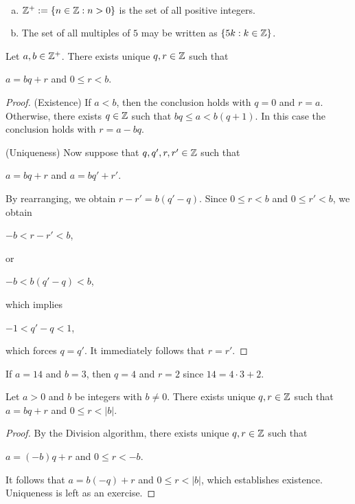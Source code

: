 \documentclass[11pt,fleqn,dvipsnames,usenames]{article}
\newcommand{\p}{\noindent}
\begin{document}
\begin{examples}~
\begin{enumerate}[(a)]
\item $\mathbb{Z}^{+} := \left\{n\in \mathbb{Z}: n > 0\right\}$ is the set of all positive integers.
\item The set of all multiples of $5$ may be written as $\left\{5k:k\in\mathbb{Z}\right\}$.
\end{enumerate}
\end{examples}
\vsp

\begin{theorem} Let $a,b\in\mathbb{Z}^{+}$.  There exists unique $q,r\in\mathbb{Z}$ such that
\begin{center}
$a = bq + r$ and $0\leq r < b$.
\end{center}
\end{theorem}
%
\begin{proof}

(Existence) If $a < b$, then the conclusion holds with $q = 0$ and $r = a$.  Otherwise, there exists $q\in\mathbb{Z}$ such that $bq \leq a < b(q + 1)$.  In this case the conclusion holds with $r = a - bq$.
\vsp

\p (Uniqueness) Now suppose that $q, q', r, r'\in \mathbb{Z}$ such that
\begin{center}
$a = bq + r$ and $a = bq' + r'$.
\end{center}
By rearranging, we obtain $r - r' = b(q' - q)$.  Since $0 \leq r < b$ and $0 \leq r' < b$, we obtain
\begin{center}
$-b < r - r' < b$,
\end{center}
or
\begin{center}
$-b < b(q' - q) < b$,
\end{center}
which implies
\begin{center}
$-1 < q' - q < 1$,
\end{center}
which forces $q = q'$.  It immediately follows that $r = r'$.
\end{proof}
%
\begin{example}
If $a = 14$ and $b=3$, then $q = 4$ and $r = 2$ since $14 = 4\cdot 3 + 2$.
\end{example}
\vsmsp

%
\begin{corollary} Let $a > 0$ and $b$ be integers with $b\neq 0$.  There exists unique $q,r\in\mathbb{Z}$ such that $a = bq + r$ and $0\leq r < |b|$.
\end{corollary}

\begin{proof} By the Division algorithm, there exists unique $q,r\in \mathbb{Z}$ such that
\begin{center}
$a = (-b)q + r$ and $0 \leq r < -b$.  
\end{center}
It follows that $a = b(-q) + r$ and $0\leq r < |b|$, which establishes existence.  Uniqueness is left as an exercise.
\end{proof}
\end{document}
